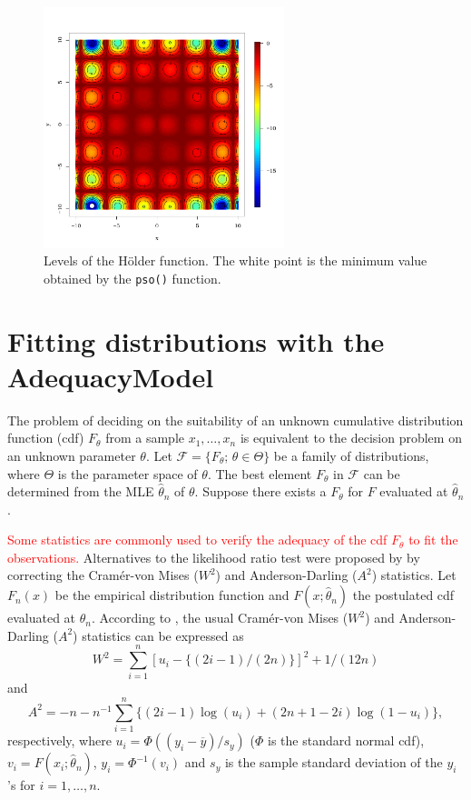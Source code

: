 \documentclass[10pt,letterpaper]{article}
\begin{document}
\begin{figure}[H]
\centering
\includegraphics[width=7cm,height=7cm]{curve_holder}
\caption{Levels of the H\"{o}lder function.
The white point is the minimum value obtained by the \texttt{pso()} function.}
\label{curves_holder}
\end{figure}


\section{Fitting distributions with the AdequacyModel}

The problem of deciding on the suitability of an unknown cumulative distribution function (cdf) $F_\theta$
from a sample $x_1,\ldots,x_n$ is equivalent to the decision problem on an unknown parameter $\theta$.
Let $\mathcal{F} = \{F_\theta;\,\theta \in \Theta \}$ be a family of distributions, where $\Theta$ is the parameter space of $\theta$.
The best element $F_{\theta}$ in $\mathcal{F}$ can be determined from the MLE $\widehat{\theta}_n$ of $\theta$.
Suppose there exists a $F_{\theta}$ for $F$ evaluated at $\widehat{\theta}_n$.

\textcolor{red}{Some statistics are commonly used to verify the adequacy of the cdf $F_\theta$ to fit the observations.}
Alternatives to the likelihood ratio test were proposed by \cite{chen1995general} by correcting the Cram\'er-von Mises ($W^2$) and Anderson-Darling ($A^2$) statistics.
Let $F_n(x)$ be the empirical distribution function and $F(x;\widehat \theta_n)$ the postulated cdf evaluated at $\widehat \theta_n$.
According to \cite{chen1995general}, the usual Cram\'er-von Mises ($W^2$) and Anderson-Darling ($A^2$) statistics can be expressed as
\begin{equation}
\label{eq:w2}
W^2 = \sum_{i=1}^{n}[u_i - \{(2i-1)/(2n) \}]^2 + 1/(12n)
\end{equation}
and
\begin{equation}
\label{eq:a2}
A^2 = -n - n^{-1}\sum_{i=1}^{n}\{(2i-1)\log(u_i) + (2n+1-2i)\log(1-u_i)\},
\end{equation}
respectively, where $u_i = \Phi((y_i-\overline{y})/s_y)$ ($\Phi$ is the standard normal cdf),
$v_i = F(x_i; \widehat \theta_n)$, $y_i = \Phi^{-1}(v_i)$ and $s_y$ is the sample standard deviation of the $y_i$'s for $i=1,\ldots, n$.
\end{document}
